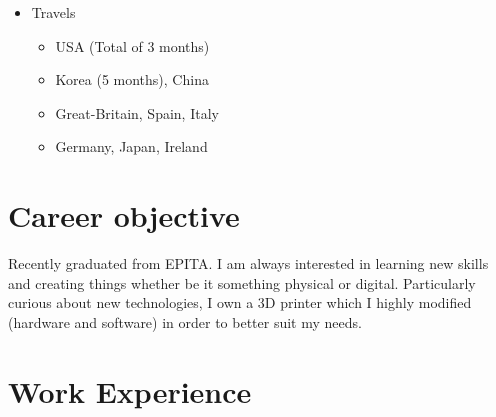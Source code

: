 \documentclass[a4paper,table]{twentysecondcv}
\begin{document}
{\begin{flushleft}
\begin{itemize}[leftmargin=1mm]
    \vspace{-5pt}
    \begin{itemize}
      \setlength\itemsep{-5pt}
      \item Tennis
      \item Bouldering
    \end{itemize}
    \item Travels
    \vspace{-5pt}
    \begin{itemize}
      \setlength\itemsep{-5pt}
      \item USA (Total of 3 months)
      \item Korea (5 months), China
      \item Great-Britain, Spain, Italy
      \item Germany, Japan, Ireland
    \end{itemize}
  \end{itemize}
  \end{flushleft}
}

\makeprofile{}

\vspace{-0.1cm}
\begin{center}
\end{center}
\vspace{-0.1cm}

\section{Career objective}

Recently graduated from EPITA\@. I am always interested in learning new skills
and creating things whether be it something physical or digital. Particularly
curious about new technologies, I own a 3D printer which I highly modified
(hardware and software) in order to better suit my needs.

\section{Work Experience}
\end{document}
